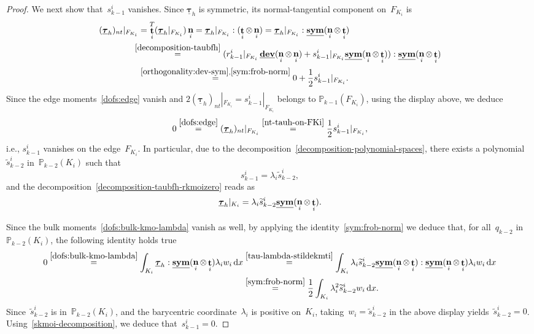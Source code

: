 \documentclass[a4paper,twoside,10pt]{article}
\theoremstyle{plain}
\theoremstyle{remark}
\theoremstyle{definition}
\numberwithin{equation}{section}
\numberwithin{figure}{section}
\newcommand{\Pbbkmo}{\mathbb{P}_{k-1}}
\newcommand{\Pbbkmt}{\mathbb{P}_{k-2}}
\newcommand{\K}{K}
\newcommand{\F}{F}
\newcommand{\taubfh}{\underline{\boldsymbol{\tau}}_h}
\DeclareMathOperator{\dev}{\underline{\mathbf{dev}}}
\newcommand{\normtang}{{nt}}
\newcommand{\sym}{\underline{\bf{sym}}}
\DeclareMathOperator{\norm}{\bf{n}}
\DeclareMathOperator{\tang}{\bf{t}}
\newcommand{\dx}{\, \mathrm{d}x}
\newcommand{\qkmt}{q_{k-2}}
\newcommand{\stildekmt}{\widetilde{s}_{k-2}}
\newcommand{\stildekmti}{\stildekmt^i}
\newcommand{\lambdai}{\lambda_i}
\newcommand{\rkmoi}{r_{k-1}^i}
\newcommand{\skmoi}{s_{k-1}^i}
\newcommand{\Ki}{{\K_i}}
\newcommand{\Fi}{{\F_{\Ki}}}
\newcommand{\normi}{\norm_i}
\newcommand{\tangi}{\tang_i}
\newcommand{\wi}{w_i}
\begin{document}
\begin{proof}
We next show that~$\skmoi$ vanishes.
Since $\taubfh$ is symmetric,
its normal-tangential component on~$\Fi$ is
\begin{equation} \label{nt-tauh-on-FKi}
\begin{split}
(\taubfh)_\normtang{}|_{\Fi}
&
= \tangi^T(\taubfh|_{\Fi}) \normi
= \taubfh|_{\Fi} : (\tangi\otimes\normi)
= \taubfh|_{\Fi} : \sym(\normi\otimes\tangi)
\\
&\!\!\!\!\overset{\eqref{decomposition-taubfh}}{=}
(\rkmoi{}|_{\Fi}\dev(\normi\otimes\normi) + \skmoi{}|_{\Fi}\sym(\normi\otimes\tangi)): \sym(\normi\otimes\tangi) \\
&\overset{\eqref{orthogonality:dev-sym},\eqref{sym:frob-norm}}{=}
0 + \frac{1}{2}\skmoi{}|_{\Fi}.
\end{split}
\end{equation}
Since the edge moments~\eqref{dofs:edge} vanish 
and $2(\taubfh)_\normtang|_{\Fi} = \skmoi|_{\Fi}$ belongs to $\Pbbkmo(\Fi)$,
using the display above,
we deduce
\begin{equation*}
\begin{split}
0
\overset{\eqref{dofs:edge}}{=}
(\taubfh)_\normtang|_{\Fi}
\overset{\eqref{nt-tauh-on-FKi}}{=} 
\frac12\skmoi{}|_{\Fi},
\end{split}
\end{equation*}
i.e., $\skmoi$ vanishes on the edge~$\Fi$.
In particular,
due to the decomposition~\eqref{decomposition-polynomial-spaces},
there exists a polynomial~$\stildekmti$ in~$\Pbbkmt(\Ki)$
such that
\begin{equation} \label{skmoi-decomposition}
\skmoi = \lambdai \stildekmti,
\end{equation}
and the decomposition~\eqref{decomposition-taubfh-rkmoizero} reads as
\begin{equation} \label{tau-lambda-stildekmti}
\taubfh|_{\Ki}
= \lambdai \stildekmti\sym(\normi\otimes\tangi).
\end{equation}

Since the bulk moments~\eqref{dofs:bulk-kmo-lambda} vanish as well,
by applying the identity~\eqref{sym:frob-norm}
we deduce that,
for all~$\qkmt$ in~$\Pbbkmt(\Ki)$,
the following identity holds true
\begin{equation*} 
\begin{split}
0 
\overset{\eqref{dofs:bulk-kmo-lambda}}{=}
\int_\Ki  \taubfh :  \sym(\normi\otimes\tangi) \lambdai\wi \dx
&\overset{\eqref{tau-lambda-stildekmti}}{=}
\int_\Ki \lambdai \stildekmti \sym(\normi\otimes\tangi) :  \sym(\normi\otimes\tangi) \lambdai\wi \dx \\
&\overset{\eqref{sym:frob-norm}}{=}
\frac12 \int_\Ki \lambdai^2 \stildekmti \wi \dx.
\end{split}
\end{equation*}
Since~$\stildekmti$ is in~$\Pbbkmt(\Ki)$,
and the barycentric coordinate~$\lambdai$ is positive on~$\Ki$,
taking~$\wi = \stildekmti$ in the above display yields~$\stildekmti = 0$.
Using~\eqref{skmoi-decomposition},
we deduce that~$\skmoi = 0$.
\end{proof}
\end{document}
